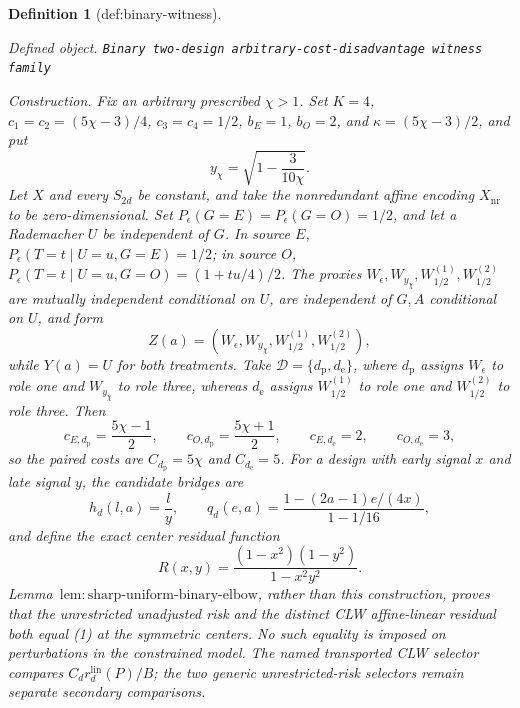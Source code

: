 \documentclass{article}
\newtheorem{definition}{Definition}
\begin{document}
\begin{definition}[def:binary-witness]\label{def:binary-witness}
\par\smallskip\noindent\emph{Defined object.} \texttt{Binary two-\allowbreak{}design arbitrary-\allowbreak{}cost-\allowbreak{}disadvantage witness family}
\par\smallskip\noindent\emph{Construction.} Fix an arbitrary prescribed \(\chi>1\). Set \(K=4\), \(c_1=c_2=(5\chi-3)/4\), \(c_3=c_4=1/2\), \(b_E=1\), \(b_O=2\), and \(\kappa=(5\chi-3)/2\), and put
\[
 y_{\chi}=\sqrt{1-\frac{3}{10\chi}}.
\]
Let \(X\) and every \(S_{2d}\) be constant, and take the nonredundant affine encoding \(X_{\mathrm{nr}}\) to be zero-dimensional. Set \(P_{\epsilon}(G=E)=P_{\epsilon}(G=O)=1/2\), and let a Rademacher \(U\) be independent of \(G\). In source \(E\), \(P_{\epsilon}(T=t\mid U=u,G=E)=1/2\); in source \(O\), \(P_{\epsilon}(T=t\mid U=u,G=O)=(1+tu/4)/2\). The proxies \(W_{\epsilon},W_{y_{\chi}},W_{1/2}^{(1)},W_{1/2}^{(2)}\) are mutually independent conditional on \(U\), are independent of \(G,A\) conditional on \(U\), and form
\[
 Z(a)=(W_{\epsilon},W_{y_{\chi}},W_{1/2}^{(1)},W_{1/2}^{(2)}),
\]
while \(Y(a)=U\) for both treatments. Take \(\mathcal D=\{d_{\mathrm p},d_{\mathrm e}\}\), where \(d_{\mathrm p}\) assigns \(W_{\epsilon}\) to role one and \(W_{y_{\chi}}\) to role three, whereas \(d_{\mathrm e}\) assigns \(W_{1/2}^{(1)}\) to role one and \(W_{1/2}^{(2)}\) to role three. Then
\[
 c_{E,d_{\mathrm p}}=\frac{5\chi-1}{2},\qquad
 c_{O,d_{\mathrm p}}=\frac{5\chi+1}{2},\qquad
 c_{E,d_{\mathrm e}}=2,\qquad c_{O,d_{\mathrm e}}=3,
\]
so the paired costs are \(C_{d_{\mathrm p}}=5\chi\) and \(C_{d_{\mathrm e}}=5\). For a design with early signal \(x\) and late signal \(y\), the candidate bridges are
\[
 h_d(l,a)=\frac{l}{y},
 \qquad
 q_d(e,a)=\frac{1-(2a-1)e/(4x)}{1-1/16},
\]
and define the exact center residual function
\[
 R(x,y)=\frac{(1-x^2)(1-y^2)}{1-x^2y^2}.                  \tag{1}
\]
Lemma~\(\mathrm{lem{:}sharp\text{-}uniform\text{-}binary\text{-}elbow}\), rather than this construction, proves that the unrestricted unadjusted risk and the distinct CLW affine-linear residual both equal (1) at the symmetric centers. No such equality is imposed on perturbations in the constrained model. The named transported CLW selector compares \(C_dr_d^{\mathrm{lin}}(P)/B\); the two generic unrestricted-risk selectors remain separate secondary comparisons.


\end{definition}
\end{document}
